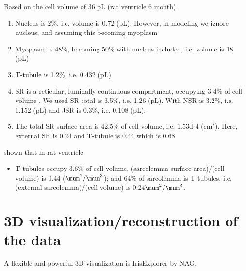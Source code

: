 Based on the cell volume of 36 pL (rat ventricle 6 month). 
\begin{enumerate}
  \item Nucleus is 2\%, i.e. volume is 0.72 (pL). However, in modeling we ignore
  nucleus, and assuming this becoming myoplasm
  \item Myoplasm is 48\%, becoming 50\% with nucleus included, i.e. volume is 18
  (pL)
  \item T-tubule is 1.2\%, i.e. 0.432 (pL)
  \item SR is a reticular, luminally continuous compartment, occupying 3-4\% of
  cell volume \citep{page1978,brochet2005}. We used SR total is 3.5\%, i.e. 1.26
  (pL).
  With NSR is 3.2\%, i.e.
  1.152 (pL) and JSR is 0.3\%, i.e. 0.108 (pL). 
  \item The total SR surface area is 42.5\% of cell volume, i.e. 1.53d-4
  (cm$^2$). Here, external SR is 0.24 and T-tubule is 0.44 which is 0.68
\end{enumerate}

\citep{soeller1999} shown that in rat ventricle
\begin{itemize}
  \item T-tubules occupy 3.6\% of cell volume, (sarcolemma surface area)/(cell
  volume) is 0.44 ($\mum^2/\mum^3$); and 64\% of sarcolemma is T-tubules, i.e. (external
  sarcolemma)/(cell volume) is 0.24$\mum^2/\mum^3$. 
  
\end{itemize}



\section{3D visualization/reconstruction of the data}

A flexible and powerful 3D visualization is IrisExplorer by NAG.




